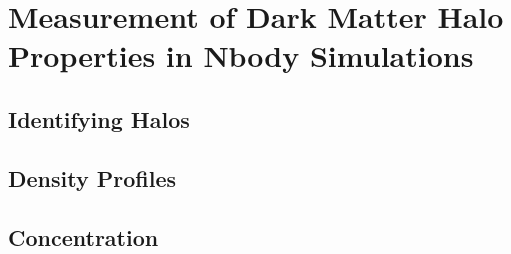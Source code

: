 
\section{Measurement of Dark Matter Halo Properties in Nbody Simulations}
\label{sec:properties}



\subsection{Identifying Halos}



\subsection{Density Profiles}



\subsection{Concentration}



